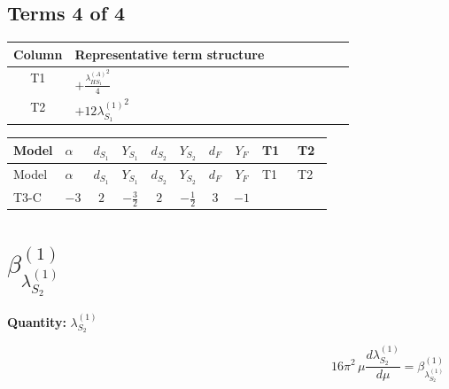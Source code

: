 \documentclass[8pt]{article}
\begin{document}
\begin{landscape}
\subsection*{Terms 4 of 4}
\begin{center}
\begin{tabular}{@{}c >{\raggedright\arraybackslash}p{0.82\linewidth}@{}}
\toprule
Column & Representative term structure \\
\midrule
T1 & \(\displaystyle +\frac{{\lambda_{HS_1}^{(A)}}^2}{4}\) \\
\midrule
T2 & \(\displaystyle +12 {\lambda_{S_1}^{(1)}}^2\) \\
\midrule
\bottomrule
\end{tabular}
\end{center}
\smallskip
\tiny
\begin{longtable}{@{}llcccccc >{\raggedright\arraybackslash}p{0.21\linewidth} >{\raggedright\arraybackslash}p{0.21\linewidth}@{}}
\toprule
Model & $\alpha$ & $d_{S_1}$ & $Y_{S_1}$ & $d_{S_2}$ & $Y_{S_2}$ & $d_F$ & $Y_F$ & T1 & T2 \\
\midrule
\endfirsthead
\toprule
Model & $\alpha$ & $d_{S_1}$ & $Y_{S_1}$ & $d_{S_2}$ & $Y_{S_2}$ & $d_F$ & $Y_F$ & T1 & T2 \\
\midrule
\endhead
T3-C & $-3$ & $2$ & $-\frac{3}{2}$ & $2$ & $-\frac{1}{2}$ & $3$ & $-1$ & \scriptsize\adjustbox{max width=\linewidth}{$\begin{gathered} +\frac{{\lambda_{HS_1}^{(A)}}^2}{4}\end{gathered}$} & \scriptsize\adjustbox{max width=\linewidth}{$\begin{gathered} +12 {\lambda_{S_1}^{(1)}}^2\end{gathered}$} \\
\midrule
\bottomrule
\end{longtable}
\clearpage
\section*{$\beta_{\lambda_{S_2}^{(1)}}^{(1)}$}
\noindent\textbf{Quantity: }$\lambda_{S_2}^{(1)}$\par\smallskip
\[16\pi^2\,\mu\frac{d \lambda_{S_2}^{(1)}}{d\mu}=\beta_{\lambda_{S_2}^{(1)}}^{(1)}\]

\end{landscape}
\end{document}
